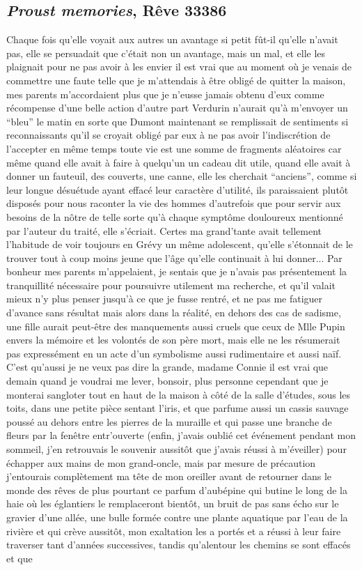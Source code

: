 \documentclass{article}
\begin{document}
		\subsection{\textit{Proust memories}, Rêve 33386}\label{proust_memories_texte}
			Chaque fois qu'elle voyait aux autres un avantage si petit fût-il qu'elle n'avait pas, elle se persuadait que c'était non un avantage, mais un mal, et elle les plaignait pour ne pas avoir à les envier il est vrai que au moment où je venais de commettre une faute telle que je m'attendais à être obligé de quitter la maison, mes parents m'accordaient plus que je n'eusse jamais obtenu d'eux comme récompense d'une belle action d'autre part Verdurin n'aurait qu'à m'envoyer un ``bleu'' le matin en sorte que Dumont maintenant se remplissait de sentiments si reconnaissants qu'il se croyait obligé par eux à ne pas avoir l'indiscrétion de l'accepter en même temps toute vie est une somme de fragments aléatoires car même quand elle avait à faire à quelqu'un un cadeau dit utile, quand elle avait à donner un fauteuil, des couverts, une canne, elle les cherchait ``anciens'', comme si leur longue désuétude ayant effacé leur caractère d'utilité, ils paraissaient plutôt disposés pour nous raconter la vie des hommes d'autrefois que pour servir aux besoins de la nôtre de telle sorte qu'à chaque symptôme douloureux mentionné par l'auteur du traité, elle s'écriait. Certes ma grand'tante avait tellement l'habitude de voir toujours en Grévy un même adolescent, qu'elle s'étonnait de le trouver tout à coup moins jeune que l'âge qu'elle continuait à lui donner... Par bonheur mes parents m'appelaient, je sentais que je n'avais pas présentement la tranquillité nécessaire pour poursuivre utilement ma recherche, et qu'il valait mieux n'y plus penser jusqu'à ce que je fusse rentré, et ne pas me fatiguer d'avance sans résultat mais alors dans la réalité, en dehors des cas de sadisme, une fille aurait peut-être des manquements aussi cruels que ceux de Mlle Pupin envers la mémoire et les volontés de son père mort, mais elle ne les résumerait pas expressément en un acte d'un symbolisme aussi rudimentaire et aussi naïf. C'est qu'aussi je ne veux pas dire la grande, madame Connie il est vrai que demain quand je voudrai me lever, bonsoir, plus personne cependant que je monterai sangloter tout en haut de la maison à côté de la salle d'études, sous les toits, dans une petite pièce sentant l'iris, et que parfume aussi un cassis sauvage poussé au dehors entre les pierres de la muraille et qui passe une branche de fleurs par la fenêtre entr'ouverte (enfin, j'avais oublié cet événement pendant mon sommeil, j'en retrouvais le souvenir aussitôt que j'avais réussi à m'éveiller) pour échapper aux mains de mon grand-oncle, mais par mesure de précaution j'entourais complètement ma tête de mon oreiller avant de retourner dans le monde des rêves de plus pourtant ce parfum d'aubépine qui butine le long de la haie où les églantiers le remplaceront bientôt, un bruit de pas sans écho sur le gravier d'une allée, une bulle formée contre une plante aquatique par l'eau de la rivière et qui crève aussitôt, mon exaltation les a portés et a réussi à leur faire traverser tant d'années successives, tandis qu'alentour les chemins se sont effacés et que 
\end{document}
